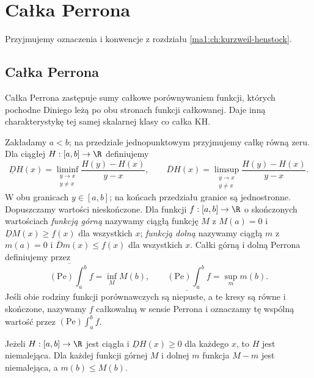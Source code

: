 \chapter{Całka Perrona}
\providecommand{\atlasref}[2]{#2}
\label{ma1:ch:calka-perrona}
\begingroup
\providecommand{\osc}{\operatorname{osc}}
\providecommand{\Var}{\operatorname{Var}}
\providecommand{\mesh}{\operatorname{mesh}}
\providecommand{\supp}{\operatorname{supp}}
\providecommand{\AC}{\mathrm{AC}}
\providecommand{\BV}{\mathrm{BV}}
\providecommand{\HK}{\mathrm{KH}}
\providecommand{\ind}[1]{\chi_{#1}}
\providecommand{\Dn}{\underline D}
\providecommand{\Du}{\overline D}
\providecommand{\KS}{\mathrm{KS}}
Przyjmujemy oznaczenia i konwencje z rozdziału \ref{ma1:ch:kurzweil-henstock}.
\section{Całka Perrona}
Całka Perrona zastępuje sumy całkowe porównywaniem funkcji, których pochodne Diniego leżą po obu stronach funkcji całkowanej. Daje inną charakterystykę tej samej skalarnej klasy co całka KH.
\begin{definicja}\label{it:def:perron}
Zakładamy $a<b$; na przedziale jednopunktowym przyjmujemy całkę równą zeru.
Dla ciągłej $H:[a,b]\to\R$ definiujemy
\[
\Dn H(x)=\liminf_{\substack{y\to x\\y\ne x}}\frac{H(y)-H(x)}{y-x},\qquad
\Du H(x)=\limsup_{\substack{y\to x\\y\ne x}}\frac{H(y)-H(x)}{y-x}.
\]
W obu granicach $y\in[a,b]$; na końcach przedziału
granice są jednostronne. Dopuszczamy wartości nieskończone. Dla funkcji $f:[a,b]\to\R$ o skończonych wartościach \emph{funkcją górną} nazywamy ciągłą funkcję $M$ z $M(a)=0$ i $\Dn M(x)\ge f(x)$ dla wszystkich $x$; \emph{funkcją dolną} nazywamy ciągłą $m$ z $m(a)=0$ i $\Du m(x)\le f(x)$ dla wszystkich $x$. Całki górną i dolną Perrona definiujemy przez
\[
\overline{(\mathrm{Pe})\!\int_a^b}f=\inf_M M(b),\qquad
\underline{(\mathrm{Pe})\!\int_a^b}f=\sup_m m(b).
\]
Jeśli obie rodziny funkcji porównawczych są niepuste, a te kresy są równe i skończone, nazywamy $f$ całkowalną w sensie Perrona i oznaczamy tę wspólną wartość przez $(\mathrm{Pe})\int_a^b f$.
\end{definicja}
\begin{lemat}\label{it:lem:perron-order}\label{ma1:kh:lem:perron-order}
Jeżeli $H:[a,b]\to\R$ jest ciągła i $\Dn H(x)\ge0$ dla każdego $x$, to $H$ jest niemalejąca. Dla każdej funkcji górnej $M$ i dolnej $m$ funkcja $M-m$ jest niemalejąca, a $m(b)\le M(b)$.
\end{lemat}
